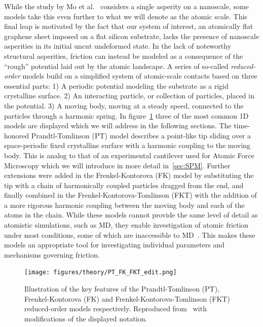 While the study by Mo et al.~\cite{mo_friction_2009} considers a single
asperity on a nanoscale, some models take this even further to what we will
denote as the atomic scale. This final leap is motivated by the fact that our
system of interest, an atomically flat graphene sheet imposed on a flat silicon
substrate, lacks the presence of nanoscale asperities in its initial uncut
undeformed state. In the lack of noteworthy structural asperities, friction can
instead be modeled as a consequence of the ``rough'' potential laid out by
the atomic landscape. A series of so-called \textit{reduced-order} models build on a
simplified system of atomic-scale contacts based on three essential parts: 1) A
periodic potential modeling the substrate as a rigid crystalline surface. 2) An
interacting particle, or collection of particles, placed in the potential. 3) A
moving body, moving at a steady speed, connected to the particles through a
harmonic spring. In figure~\cref{fig:PT_FK_FKT} three of the most common 1D
models are displayed which we will address in the following sections. The
time-honored Prandtl-Tomlinson (\acrshort{PT}) model describes a point-like tip sliding
over a space-periodic fixed crystalline surface with a harmonic coupling to the
moving body. This is analog to that of an experimental cantilever used for
Atomic Force Microscopy which we will introduce in more detail in~\cref{sec:SPM}. Further extensions were added in the Frenkel-Kontorova
(\acrshort{FK}) model by substituting the tip with a chain of harmonically coupled
particles dragged from the end, and finally combined in the
Frenkel-Kontorova-Tomlinson (\acrshort{FKT}) with the addition of a more
rigorous harmonic coupling between the moving body and each of the atoms in the
chain. While these models cannot provide the same level of detail as atomistic
simulations, such as \acrshort{MD}, they enable investigation of atomic friction
under most conditions, some of which are inaccessible to \acrshort{MD}~\cite{Yalin_2011}. This makes these models an appropriate tool for investigating
individual parameters and mechanisms governing friction.


\begin{figure}[H]
  \centering
  \texttt{[image: figures/theory/PT\_FK\_FKT\_edit.png]}
  \caption{Illustration of the key features of the Prandtl-Tomlinson (\acrshort{PT}), Frenkel-Kontorova (\acrshort{FK}) and Frenkel-Kontorova-Tomlinson (\acrshort{FKT}) reduced-order models respectively. Reproduced from~\cite{Yalin_2011} with modifications of the displayed notation.}
  \label{fig:PT_FK_FKT}
\end{figure}


